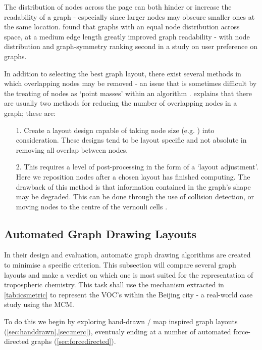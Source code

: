 The distribution of nodes across the page can both hinder or increase the readability of a graph - especially since larger nodes may obscure smaller ones at the same location. \cite{ch6graphredability} found that graphs with an equal node distribution across space, at a medium edge length greatly improved graph readability - with node distribution and graph-symmetry ranking second in a study on user preference on graphs. 

In addition to selecting the best graph layout, there exist several methods in which overlapping nodes may be removed - an issue that is sometimes difficult by the treating of nodes as `point masses' within an algorithm \citep{nodeoverlap}. \cite{IPSEPCOLA} explains that there are usually two methods for reducing the number of overlapping nodes in a graph; these are:


\begin{itemize}
\item [1.] Create a layout design capable of taking node size (e.g. \citep{nons}) into consideration. These designs tend to be layout specific and not absolute in removing all overlap between nodes. 
\item [2.] This requires a level of post-processing in the form of a `layout adjustment'. Here we reposition nodes after a chosen layout has finished computing. The drawback of this method is that information contained in the graph's shape may be degraded. This can be done through the use of collision detection, or moving nodes to the centre of the vernouli cells \citep{novern}. 
\end{itemize}




\subsection{Automated Graph Drawing Layouts}\label{sec:drawing}


In their design and evaluation, automatic graph drawing algorithms are created to minimise a specific criterion. This subsection will compare several graph layouts and make a verdict on which one is most suited for the representation of tropospheric chemistry. This task shall use the mechanism extracted in \autoref{tab:icsmetric} to represent the VOC's within the Beijing city - a real-world case study using the MCM. 

To do this we begin by exploring hand-drawn / map inspired graph layouts (\autoref{sec:handdrawn},\autoref{sec:merc}), eventualy ending at a number of  automated force-directed graphs (\autoref{sec:forcedirected}).


